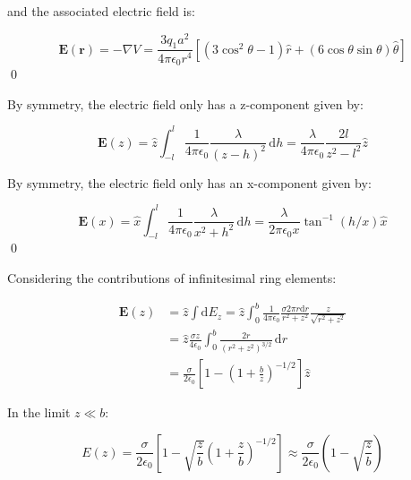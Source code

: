 \documentclass[12pt]{article}
\begin{document}
and the associated electric field is:

\begin{equation}
    \mathbf{E}(\mathbf{r}) = - \nabla V = \frac{3q_{1}a^{2}}{4\pi\epsilon_{0}r^{4}} \left[ (3\cos^{2}{\theta} - 1) \hat{r} + (6\cos{\theta} \sin{\theta}) \hat{\theta} \right]
\end{equation}
\qed



By symmetry, the electric field only has a z-component given by:

\begin{equation}
    \mathbf{E}(z) = \hat{z} \int_{-l}^{l} \frac{1}{4\pi\epsilon_{0}} \frac{\lambda}{(z - h)^{2}} \, \mathrm{d}h = \frac{\lambda}{4\pi\epsilon_{0}} \frac{2l}{z^{2} - l^{2}} \hat{z}
\end{equation}

By symmetry, the electric field only has an x-component given by:

\begin{equation}
    \mathbf{E}(x) = \hat{x} \int_{-l}^{l} \frac{1}{4\pi\epsilon_{0}} \frac{\lambda}{x^{2} + h^{2}} \, \mathrm{d}h = \frac{\lambda}{2\pi\epsilon_{0}x} \tan^{-1}{(h/x)} \hat{x}
\end{equation}
\qed



Considering the contributions of infinitesimal ring elements:

\begin{equation}
\begin{split}
    \mathbf{E}(z) &= \hat{z} \int \mathrm{d}E_{z} = \hat{z} \int_{0}^{b} \frac{1}{4\pi\epsilon_{0}} \frac{\sigma 2\pi r \mathrm{d}r}{r^{2} + z^{2}} \frac{z}{\sqrt{r^{2} + z^{2}}} \\
    &= \hat{z} \frac{\sigma z}{4\epsilon_{0}} \int_{0}^{b} \frac{2r}{(r^{2} + z^{2})^{3/2}} \, \mathrm{d}r \\
    &= \frac{\sigma}{2\epsilon_{0}} \left[ 1 - \left( 1 + \frac{b}{z} \right)^{-1/2} \right] \hat{z}
\end{split}
\end{equation}

In the limit $z \ll b$:

\begin{equation}
    E(z) = \frac{\sigma}{2\epsilon_{0}} \left[ 1 - \sqrt{\frac{z}{b}} \left( 1 + \frac{z}{b} \right)^{-1/2} \right] \approx \frac{\sigma}{2\epsilon_{0}} \left( 1 - \sqrt{\frac{z}{b}} \right)
\end{equation}
\end{document}
